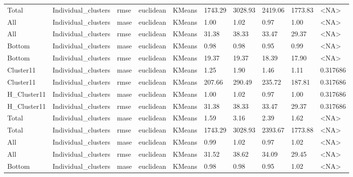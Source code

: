 \begin{tabular}{llllllllll}
      Total & Individual\_clusters &   rmse &  euclidean &        KMeans & 1743.29 &  3028.93 &               2419.06 &       1773.83 &      <NA> \\
        All & Individual\_clusters &   mase &  euclidean &        KMeans &    1.00 &     1.02 &                  0.97 &          1.00 &      <NA> \\
        All & Individual\_clusters &   rmse &  euclidean &        KMeans &   31.38 &    38.33 &                 33.47 &         29.37 &      <NA> \\
     Bottom & Individual\_clusters &   mase &  euclidean &        KMeans &    0.98 &     0.98 &                  0.95 &          0.99 &      <NA> \\
     Bottom & Individual\_clusters &   rmse &  euclidean &        KMeans &   19.37 &    19.37 &                 18.39 &         17.90 &      <NA> \\
  Cluster11 & Individual\_clusters &   mase &  euclidean &        KMeans &    1.25 &     1.90 &                  1.46 &          1.11 &  0.317686 \\
  Cluster11 & Individual\_clusters &   rmse &  euclidean &        KMeans &  207.66 &   290.49 &                235.72 &        187.81 &  0.317686 \\
H\_Cluster11 & Individual\_clusters &   mase &  euclidean &        KMeans &    1.00 &     1.02 &                  0.97 &          1.00 &  0.317686 \\
H\_Cluster11 & Individual\_clusters &   rmse &  euclidean &        KMeans &   31.38 &    38.33 &                 33.47 &         29.37 &  0.317686 \\
      Total & Individual\_clusters &   mase &  euclidean &        KMeans &    1.59 &     3.16 &                  2.39 &          1.62 &      <NA> \\
      Total & Individual\_clusters &   rmse &  euclidean &        KMeans & 1743.29 &  3028.93 &               2393.67 &       1773.88 &      <NA> \\
        All & Individual\_clusters &   mase &  euclidean &        KMeans &    0.99 &     1.02 &                  0.97 &          1.02 &      <NA> \\
        All & Individual\_clusters &   rmse &  euclidean &        KMeans &   31.52 &    38.62 &                 34.09 &         29.45 &      <NA> \\
     Bottom & Individual\_clusters &   mase &  euclidean &        KMeans &    0.98 &     0.98 &                  0.95 &          1.02 &      <NA> \\

\end{tabular}
